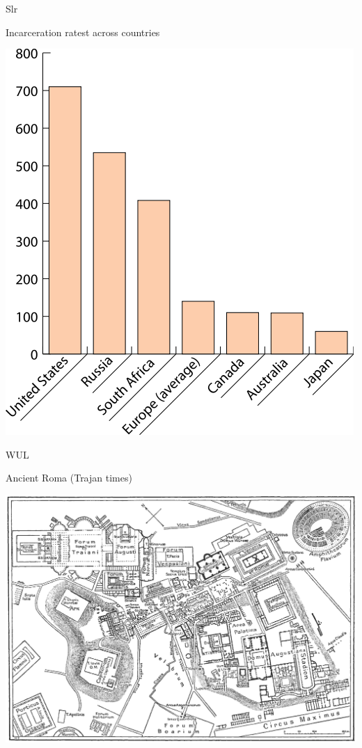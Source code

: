 \begin{chart}{S}{lr}
\caption{Incarceration ratest across countries}
\label{chart:incarceration}
\includegraphics[width=\chartwidth,height=\chartheight]{incarceration}  
\end{chart}

\begin{map}{W}{UL}
\caption{Ancient Roma  (Trajan times)}
\label{map:roma}
\includegraphics[width=\chartwidth,height=\chartheight]{Rome}
\end{map}

